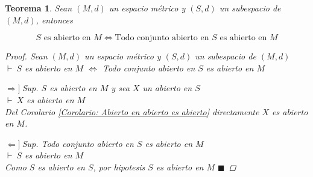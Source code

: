 \documentclass[oneside]{book} %
\theoremstyle{Teorema}
\newtheorem{Teorema}[Definicion]{Teorema}
\theoremstyle{Ejemplos}
\theoremstyle{[Obs]}
\renewcommand{\{}{\left\lbrace} %
\renewcommand{\}}{\right\rbrace} %
\renewcommand{\qed}{$\blacksquare$} %
\newcommand{\pd}{$\vdash\ $} %
\newcommand{\necesidad}{$\Rightarrow]\ $} %
\newcommand{\suficiencia}{$\Leftarrow]\ $} %
\begin{document}
			\begin{Teorema}\setlength{\parindent}{0em}
			
				Sean $(M, d)$ un espacio métrico y $(S, d)$ un subespacio de $(M, d)$, entonces 

				\[ S \text{ es abierto en } M \Leftrightarrow \text{Todo conjunto abierto en } S \text{ es abierto en } M \]
			
				\begin{proof}
					
					Sean $(M, d)$ un espacio métrico y $(S, d)$ un subespacio de $(M, d)$ \\ 
					\pd $S$ es abierto en $M$ $\Leftrightarrow$ Todo conjunto abierto en $S$ es abierto en $M$ 

					\necesidad Sup. $S$ es abierto en $M$ y sea $X$ un abierto en $S$ \\ 
					\pd $X$ es abierto en $M$ \\ 
					Del Corolario \ref{Corolario: Abierto en abierto es abierto} directamente $X$ es abierto en $M$.

					\suficiencia Sup. Todo conjunto abierto en $S$ es abierto en $M$ \\ 
					\pd $S$ es abierto en $M$ \\ 
					Como $S$ es abierto en $S$, por hipotesis $S$ es abierto en $M$ \qed

				\end{proof}

			\end{Teorema}
\end{document}
